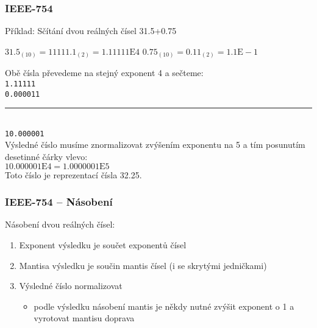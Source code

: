 \documentclass{beamer}
\begin{document}
\begin{frame}
\frametitle{IEEE-754}

Příklad: Sčítání dvou reálných čísel 31.5+0.75

$31.5_{(10)} = 11111.1_{(2)} = 1.11111\text{E}4$ \phantom{xxx} $0.75_{(10)} = 0.11_{(2)} = 1.1\text{E}-1$

\bigskip
Obě čísla převedeme na stejný exponent 4 a sečteme:\\
\texttt{\phantom{xx}1.11111}\\
\texttt{\phantom{xx}0.000011}\vspace{-6pt}\\
\rule[0pt]{2cm}{0.4pt}\\
\texttt{\phantom{x}10.000001}\\

Výsledné číslo musíme znormalizovat zvýšením exponentu na 5 a tím posunutím desetinné čárky vlevo:\\
$10.000001\text{E}4 = 1.0000001\text{E}5$\\

Toto číslo je reprezentací čísla 32.25.

\end{frame}

\begin{frame}
\frametitle{IEEE-754 -- Násobení}

Násobení dvou reálných čísel:
\begin{enumerate}
\item Exponent výsledku je součet exponentů čísel
\item Mantisa výsledku je součin mantis čísel (i se skrytými jedničkami)
\item Výsledné číslo normalizovat
\begin{itemize}
\item podle výsledku násobení mantis je někdy nutné zvýšit exponent o 1 a vyrotovat mantisu doprava
\end{itemize}
\end{enumerate}
\end{frame}
\end{document}
